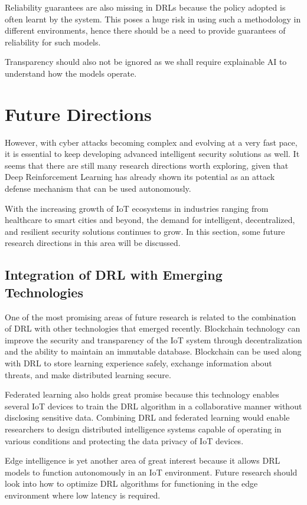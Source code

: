 \documentclass[12pt]{article}
\begin{document}
Reliability guarantees are also missing in DRLs because the policy adopted is often learnt by the system. This poses a huge risk in using such a methodology in different environments, hence there should be a need to provide guarantees of reliability for such models.

Transparency should also not be ignored as we shall require explainable AI to understand how the models operate.

	\section{Future Directions}
	However, with cyber attacks becoming complex and evolving at a very fast pace, it is essential to keep developing advanced intelligent security solutions as well. It seems that there are still many research directions worth exploring, given that Deep Reinforcement Learning has already shown its potential as an attack defense mechanism that can be used autonomously.

With the increasing growth of IoT ecosystems in industries ranging from healthcare to smart cities and beyond, the demand for intelligent, decentralized, and resilient security solutions continues to grow. In this section, some future research directions in this area will be discussed.
\subsection{Integration of DRL with Emerging Technologies}
One of the most promising areas of future research is related to the combination of DRL with other technologies that emerged recently. Blockchain technology can improve the security and transparency of the IoT system through decentralization and the ability to maintain an immutable database. Blockchain can be used along with DRL to store learning experience safely, exchange information about threats, and make distributed learning secure.

Federated learning also holds great promise because this technology enables several IoT devices to train the DRL algorithm in a collaborative manner without disclosing sensitive data. Combining DRL and federated learning would enable researchers to design distributed intelligence systems capable of operating in various conditions and protecting the data privacy of IoT devices.

Edge intelligence is yet another area of great interest because it allows DRL models to function autonomously in an IoT environment. Future research should look into how to optimize DRL algorithms for functioning in the edge environment where low latency is required.	
\end{document}

